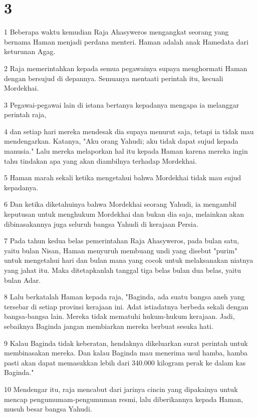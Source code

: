 \chapter{3}

\par 1 Beberapa waktu kemudian Raja Ahasyweros mengangkat seorang yang bernama Haman menjadi perdana menteri. Haman adalah anak Hamedata dari keturunan Agag.
\par 2 Raja memerintahkan kepada semua pegawainya supaya menghormati Haman dengan bersujud di depannya. Semuanya mentaati perintah itu, kecuali Mordekhai.
\par 3 Pegawai-pegawai lain di istana bertanya kepadanya mengapa ia melanggar perintah raja,
\par 4 dan setiap hari mereka mendesak dia supaya menurut saja, tetapi ia tidak mau mendengarkan. Katanya, "Aku orang Yahudi; aku tidak dapat sujud kepada manusia." Lalu mereka melaporkan hal itu kepada Haman karena mereka ingin tahu tindakan apa yang akan diambilnya terhadap Mordekhai.
\par 5 Haman marah sekali ketika mengetahui bahwa Mordekhai tidak mau sujud kepadanya.
\par 6 Dan ketika diketahuinya bahwa Mordekhai seorang Yahudi, ia mengambil keputusan untuk menghukum Mordekhai dan bukan dia saja, melainkan akan dibinasakannya juga seluruh bangsa Yahudi di kerajaan Persia.
\par 7 Pada tahun kedua belas pemerintahan Raja Ahasyweros, pada bulan satu, yaitu bulan Nisan, Haman menyuruh membuang undi yang disebut "purim" untuk mengetahui hari dan bulan mana yang cocok untuk melaksanakan niatnya yang jahat itu. Maka ditetapkanlah tanggal tiga belas bulan dua belas, yaitu bulan Adar.
\par 8 Lalu berkatalah Haman kepada raja, "Baginda, ada suatu bangsa aneh yang tersebar di setiap provinsi kerajaan ini. Adat istiadatnya berbeda sekali dengan bangsa-bangsa lain. Mereka tidak mematuhi hukum-hukum kerajaan. Jadi, sebaiknya Baginda jangan membiarkan mereka berbuat sesuka hati.
\par 9 Kalau Baginda tidak keberatan, hendaknya dikeluarkan surat perintah untuk membinasakan mereka. Dan kalau Baginda mau menerima usul hamba, hamba pasti akan dapat memasukkan lebih dari 340.000 kilogram perak ke dalam kas Baginda."
\par 10 Mendengar itu, raja mencabut dari jarinya cincin yang dipakainya untuk mencap pengumumam-pengumuman resmi, lalu diberikannya kepada Haman, musuh besar bangsa Yahudi.
